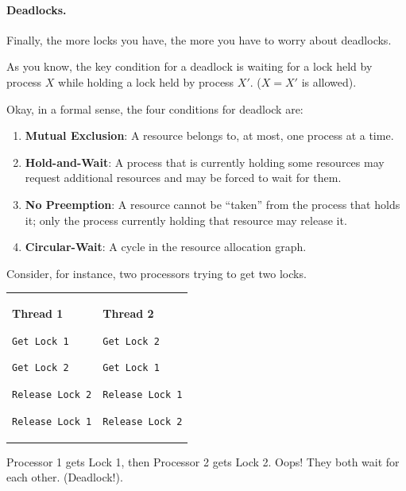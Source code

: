 \documentclass[a4paper]{report}
\begin{document}
\paragraph{Deadlocks.} Finally, the more locks you have, the more you have to worry about deadlocks.

As you know, the key condition for a deadlock is waiting for a lock held by process $X$ while holding a lock held by process $X'$. ($X = X'$ is allowed).

Okay, in a formal sense, the four conditions for deadlock are:

\begin{enumerate}
	\item \textbf{Mutual Exclusion}: A resource belongs to, at most, one process at a time.
	\item \textbf{Hold-and-Wait}: A process that is currently holding some resources may request additional resources and may be forced to wait for them.
	\item \textbf{No Preemption}: A resource cannot be ``taken'' from the process that holds it; only the process currently holding that resource may release it.
	\item \textbf{Circular-Wait}: A cycle in the resource allocation graph.
\end{enumerate}


Consider, for instance, two processors trying to get two locks.

\begin{center}
  \begin{tabular}{ll}
\begin{minipage}{.4\textwidth}
      {\bf Thread 1}

      \verb+Get Lock 1+

      \verb+Get Lock 2+

      \verb+Release Lock 2+

      \verb+Release Lock 1+
\end{minipage} & 
\begin{minipage}{.4\textwidth}
      {\bf Thread 2}

      \verb+Get Lock 2+

      \verb+Get Lock 1+

      \verb+Release Lock 1+

      \verb+Release Lock 2+
\end{minipage}
\end{tabular}
\end{center}

 Processor 1 gets Lock 1, then Processor 2 gets Lock 2. Oops! They
 both wait for each other. (Deadlock!).
\end{document}
